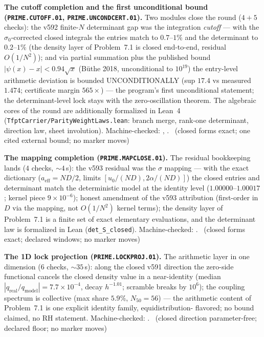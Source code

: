 \par\smallskip\noindent\textbf{The cutoff completion and the first
unconditional bound (\texttt{PRIME.CUTOFF.01},
\texttt{PRIME.UNCONDCERT.01}).}
Two modules close the round ($4+5$ checks): the v592 finite-$N$
determinant gap was the integration \emph{cutoff} --- with the
$\sigma_0$-corrected closed integrals the entries match to
$0.7$--$1\%$ and the determinant to $0.2$--$1\%$ (the density layer of
Problem~7.1 is closed end-to-end, residual $O(1/N^2)$); and via
partial summation plus the published bound
$|\psi(x)-x|<0.94\sqrt{x}$ (B\"uthe 2018, unconditional to
$10^{19}$) the entry-level arithmetic deviation is bounded
UNCONDITIONALLY (sup $17.4$ vs measured $1.474$; certificate margin
$565\times$) --- the program's first unconditional statement; the
determinant-level lock stays with the zero-oscillation theorem.  The
algebraic cores of the round are additionally formalized in Lean~4
(\texttt{TfptCarrier/ParityWeightLaws.lean}: branch merge, rank-one
determinant, direction law, sheet involution).  Machine-checked:
,
.
\mE\ (closed forms exact; one cited external bound; no marker moves)
\par\smallskip


\par\smallskip\noindent\textbf{The mapping completion
(\texttt{PRIME.MAPCLOSE.01}).}
The residual bookkeeping lands ($4$ checks, ${\sim}4$\,s): the v593
residual was the $\sigma$ mapping --- with the exact dictionary
($a_{\mathrm{eff}}=ND/2$, limits $[u_0/(ND),2\alpha/(ND)]$) the closed
entries and determinant match the deterministic model at the identity
level ($1.00000$--$1.00017$; kernel piece $9\times10^{-6}$); honest
amendment of the v593 attribution (first-order in $D$ via the mapping,
not $O(1/N^2)$ kernel terms); the density layer of Problem~7.1 is a
finite set of exact elementary evaluations, and the determinant law is
formalized in Lean (\texttt{det\_S\_closed}).  Machine-checked:
.
\mE\ (closed forms exact; declared windows; no marker moves)
\par\smallskip


\par\smallskip\noindent\textbf{The 1D lock projection
(\texttt{PRIME.LOCKPROJ.01}).}
The arithmetic layer in one dimension ($6$ checks, ${\sim}35$\,s):
along the closed v591 direction the zero-side functional cancels the
closed density value in a near-identity (median
$|q_{\mathrm{real}}/q_{\mathrm{model}}|=7.7\times10^{-4}$, decay
$h^{-1.01}$; scramble breaks by $10^6$); the coupling spectrum is
collective (max share $5.9\%$, $N_{50}=56$) --- the arithmetic content
of Problem~7.1 is one explicit identity family, equidistribution-
flavored; no bound claimed, no RH statement. Machine-checked:
.
\mE\ (closed direction parameter-free; declared floor; no marker
moves)
\par\smallskip


